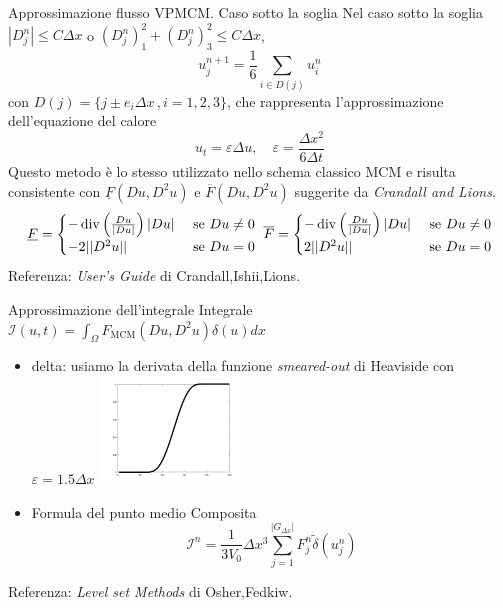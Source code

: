 \begin{frame}{Approssimazione flusso VPMCM. Caso sotto la soglia}
  Nel caso sotto la soglia $|D_j^n|\leq C\Delta x$ o
  $(D_j^n)_1^2+(D_j^n)_3^2\leq C\Delta x$, 
  \[
  u_j^{n+1}=\frac{1}{6}\sum_{i\in D(j)}u_i^n
  \]
con $D(j)=\{j\pm e_i\Delta x\,,i=1,2,3\}$, che rappresenta
l'approssimazione dell'equazione del calore
\[
u_t=\varepsilon \Delta u,\quad \varepsilon=\frac{\Delta x^2}{6\Delta t}
\]
Questo metodo è lo stesso utilizzato nello schema classico MCM e 
risulta consistente con $\underline{F}(Du,D^2u)$ e
$\overline{F}(Du,D^2u)$ suggerite da \emph{Crandall and Lions}.
\[
\underline{F}=
\begin{cases}
-\operatorname{div}\left(\frac{Du}{|Du|}\right)|Du| &\text{ se }Du\neq 0\\
-2||D^2u|| &\text{ se }Du=0
\end{cases}\,\,
\overline{F}=
\begin{cases}
-\operatorname{div}\left(\frac{Du}{|Du|}\right)|Du| &\text{ se }Du\neq 0\\
2||D^2u|| &\text{ se }Du=0
\end{cases}
\]
Referenza: \emph{User's Guide} di Crandall,Ishii,Lions.
\end{frame}

\begin{frame}{Approssimazione dell'integrale}
  Integrale $\mathcal{I}(u,t)=\int_{\Omega}F_{\text{MCM}}(Du,D^2u)\delta(u)dx$
  \begin{itemize}
    \item delta: usiamo la derivata della funzione
      \emph{smeared-out} di Heaviside con $\varepsilon=1.5\Delta x$
      \includegraphics[width=0.3\textwidth]{graphics/heavside/heavside}
        \item Formula del punto medio Composita
          \[
          \mathcal{I}^n=\frac{1}{3V_0}\Delta x^3\sum_{j=1}^{|G_{\Delta x}|}F_j^n\tilde{\delta}(u_j^n)
          \]
          
  \end{itemize}
Referenza: \emph{Level set Methods} di Osher,Fedkiw.
\end{frame}


